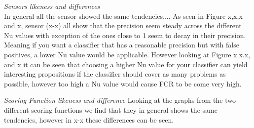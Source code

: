 \textit{Sensors likeness and differences}\\
In general all the sensor showed the same tendencies....
As seen in Figure x,x,x and x, sensor (x-x) all show that the precision seem steady across the different Nu values with exception of the ones close to 1 seem to decay in their precision. Meaning if you want a classifier that has a reasonable precision but with false positives, a lower Nu value would be applicable.
However looking at Figure x.x.x, and x it can be seen that choosing a higher Nu value for your classifier can yield interesting propositions if the classifier should cover as many problems as possible, however too high a Nu value would cause FCR to be come very high.


\textit{Scoring Function likeness and difference}
Looking at the graphs from the two different scoring functions we find that they in general shows the same tendencies, however in x-x these differences can be seen. 

